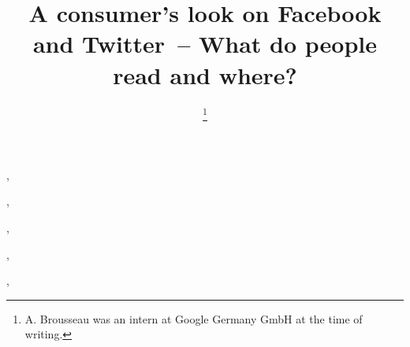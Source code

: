 \documentclass{iosart2c}
\begin{document}
\begin{frontmatter}

\title{A consumer's look on Facebook and Twitter~-- What do people read and where?}

\author[A]{ },
\author[B]{ },
\author[A]{ \thanks{A. Brousseau was an intern at Google Germany GmbH at the time of writing.}},
\author[C]{ },
\author[B]{ },
\author[D]{ }


\address[A]{Google Germany GmbH, ABC-Str. 19, 20354 Hamburg, Germany,\\
E-mail: tomac@google.com, arnaud.brousseau@gmail.com}
\address[B]{Ghent University -- IBBT, ELIS, Multimedia Lab, Gaston Crommenlaan 8/201, 9050 Ghent, Belgium,\\
E-mail: ruben.verborgh@ugent.be, rik.vandewalle@ugent.be}
\address[C]{EURECOM, Sophia Antipolis, France\\
E-mail: raphael.troncy@eurecom.fr}
\address[D]{Universitat Polit\`{e}cnica de Catalunya, Department LSI, 08034 Barcelona, Spain,\\
E-mail: gabarro@lsi.upc.edu}


\end{frontmatter}
\end{document}
